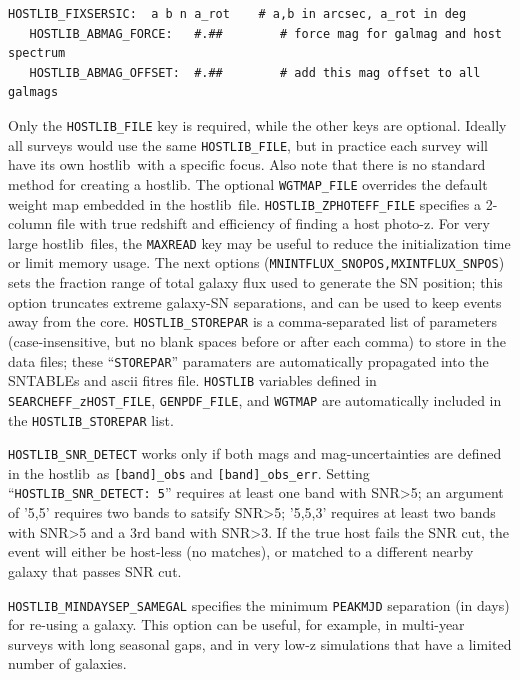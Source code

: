 \documentclass[12pt]{article}
\newcommand{\hostlib}{{\sc hostlib}}
\begin{document}
{\begin{Verbatim}[frame=single]
   HOSTLIB_FIXSERSIC:  a b n a_rot    # a,b in arcsec, a_rot in deg
   HOSTLIB_ABMAG_FORCE:   #.##        # force mag for galmag and host spectrum
   HOSTLIB_ABMAG_OFFSET:  #.##        # add this mag offset to all galmags
\end{Verbatim}
Only the {\tt HOSTLIB\_FILE} key is required, while the
other keys are optional. Ideally all surveys would use
the same {\tt HOSTLIB\_FILE}, but in practice each survey
will have its own \hostlib\ with a specific focus.
Also note that there is no standard method for creating 
a \hostlib. The optional {\tt WGTMAP\_FILE} overrides the 
default weight map embedded in the
\hostlib\ file. 
{\tt HOSTLIB\_ZPHOTEFF\_FILE} specifies a 2-column file with
true redshift and efficiency of finding a host photo-z.
For very large \hostlib\ files,
the {\tt MAXREAD} key may be useful to reduce the 
initialization time or limit memory usage.
The next options ({\tt MNINTFLUX\_SNOPOS,MXINTFLUX\_SNPOS}) sets the
fraction range of total galaxy flux used to generate the
SN position; this option truncates extreme galaxy-SN
separations, and can be used to keep events away from the core.
{\tt HOSTLIB\_STOREPAR} is a comma-separated
list of parameters (case-insensitive, but no blank spaces
before or after each comma) to store in the data files;
these ``{\tt STOREPAR}'' paramaters are automatically propagated 
into the SNTABLEs  and ascii fitres file.
{\tt HOSTLIB} variables defined in 
{\tt SEARCHEFF\_zHOST\_FILE},
{\tt GENPDF\_FILE}, and
{\tt WGTMAP}
are automatically included in the {\tt HOSTLIB\_STOREPAR} list.


{\tt HOSTLIB\_SNR\_DETECT} works only if both mags and mag-uncertainties
are defined in the \hostlib\ as {\tt [band]\_obs} and {\tt [band]\_obs\_err}.
Setting ``{\tt HOSTLIB\_SNR\_DETECT: 5}'' requires at least one band with
SNR>5; an argument of '5,5' requires two bands to satsify SNR>5;
'5,5,3' requires at least two bands with SNR>5 and a 3rd band with SNR>3.
If the true host fails the SNR cut, the event will either be host-less
(no matches), or matched to a different nearby galaxy that
passes SNR cut.

{\tt HOSTLIB\_MINDAYSEP\_SAMEGAL} specifies the minimum
{\tt PEAKMJD} separation (in days) for re-using a galaxy.
This option can be useful, for example, in multi-year surveys 
with long seasonal gaps, and in very low-z simulations that have 
a limited number of galaxies.


}
\end{document}
